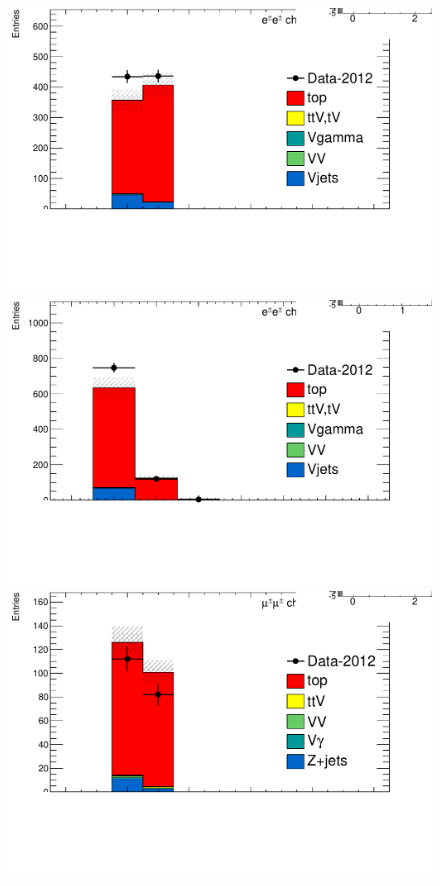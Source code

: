  \begin{figure}[htbp]

  \begin{minipage}[h]{0.5\textwidth}
    \centering \includegraphics[width=\textwidth]{figs/fake/TaT-23jets-1b_nj_ee}
  \end{minipage}\hfill
  \begin{minipage}[h]{0.5\textwidth}
    \centering \includegraphics[width=\textwidth]{figs/fake/TaT-23jets-1b_nb_ee}
  \end{minipage}\hfill
  \begin{minipage}[h]{0.5\textwidth}
    \centering \includegraphics[width=\textwidth]{figs/fake/TaT-23jets-1b_nj_mm}

\end{minipage}
\end{figure}
